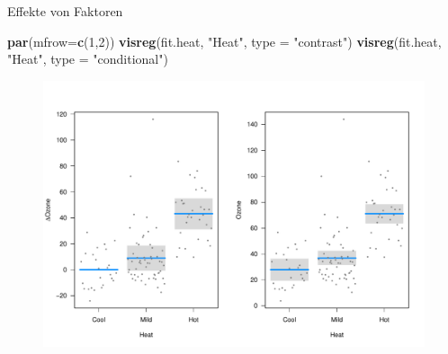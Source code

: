 \documentclass[ignorenonframetext,]{beamer}
\newenvironment{Shaded}{}{}
\newcommand{\KeywordTok}[1]{\textcolor[rgb]{0.00,0.44,0.13}{\textbf{{#1}}}}
\newcommand{\DataTypeTok}[1]{\textcolor[rgb]{0.56,0.13,0.00}{{#1}}}
\newcommand{\DecValTok}[1]{\textcolor[rgb]{0.25,0.63,0.44}{{#1}}}
\newcommand{\StringTok}[1]{\textcolor[rgb]{0.25,0.44,0.63}{{#1}}}
\newcommand{\NormalTok}[1]{{#1}}
\begin{document}
\begin{frame}[fragile]{Effekte von Faktoren}

\begin{Shaded}
\begin{Highlighting}[]
\KeywordTok{par}\NormalTok{(}\DataTypeTok{mfrow=}\KeywordTok{c}\NormalTok{(}\DecValTok{1}\NormalTok{,}\DecValTok{2}\NormalTok{))}
\KeywordTok{visreg}\NormalTok{(fit.heat, }\StringTok{"Heat"}\NormalTok{, }\DataTypeTok{type =} \StringTok{"contrast"}\NormalTok{)}
\KeywordTok{visreg}\NormalTok{(fit.heat, }\StringTok{"Heat"}\NormalTok{, }\DataTypeTok{type =} \StringTok{"conditional"}\NormalTok{)}
\end{Highlighting}
\end{Shaded}

\begin{figure}[htbp]
\centering
\includegraphics{RSocialScience2_files/figure-beamer/unnamed-chunk-84-1.pdf}
\caption{}
\end{figure}

\end{frame}
\end{document}
